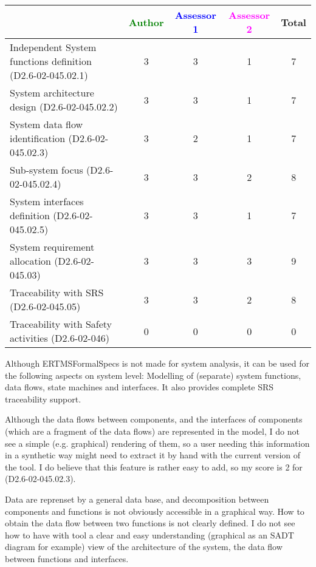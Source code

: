 \begin{tabular}{|l | c | c | c | c|}
\hline
& \textcolor{green}{Author} & \textcolor{blue}{Assessor 1} & \textcolor{magenta}{Assessor 2} & Total \\
\hline
Independent System functions definition (D2.6-02-045.02.1)  & 3 & 3 & 1 & 7  \\
\hline 
System architecture design (D2.6-02-045.02.2) & 3 & 3 & 1 & 7 \\
\hline
System data flow identification (D2.6-02-045.02.3)  & 3 & 2 & 1 & 7 \\
\hline
Sub-system focus (D2.6-02-045.02.4)  & 3 & 3 & 2 & 8 \\
\hline
System interfaces definition (D2.6-02-045.02.5)  & 3 & 3 & 1 & 7 \\
\hline
System requirement allocation (D2.6-02-045.03)  & 3 & 3 & 3 & 9 \\
\hline
Traceability with SRS (D2.6-02-045.05)  & 3 & 3 & 2 & 8 \\
\hline
Traceability with Safety activities (D2.6-02-046)  & 0 & 0 & 0 & 0 \\
\hline
\end{tabular}

\begin{author_comment}
Although ERTMSFormalSpecs is not made for system analysis, it can be used for the following aspects on system level: Modelling of (separate) system functions, data flows, state machines and interfaces. It also provides complete SRS traceability support.  
\end{author_comment}

\begin{assessor1}
Although the data flows between components, and the interfaces of components (which are a fragment of the data flows) are represented in the model, I do not see a simple (e.g. graphical) rendering of them, so a user needing this information in a synthetic way might need to extract it by hand with the current version of the tool. I do believe that this feature is rather easy to add, so my score is 2 for (D2.6-02-045.02.3). 
\end{assessor1}


\begin{assessor2}
Data are reprenset by a general data base, and decomposition between components and functions is not obviously  accessible in a graphical way. How to obtain the data flow between two  functions is not clearly defined.
I do not see how to have with tool a clear and easy understanding (graphical as an SADT diagram for example) view of the architecture of the system, the data flow between functions and interfaces.
\end{assessor2}

